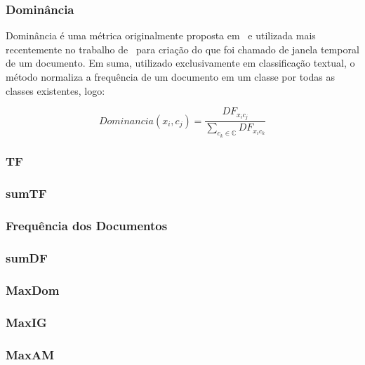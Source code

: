 \subsubsection{Dominância}
\label{subsubsection::dom}

Dominância é uma métrica originalmente proposta em~\cite{Zaiane02} e utilizada mais recentemente no trabalho de~\cite{Rocha08} para criação do que foi chamado de janela temporal de um documento. Em suma, utilizado exclusivamente em classificação textual, o método normaliza a frequência de um documento em um classe por todas as classes existentes, logo:

\begin{equation}\label{eqn::dom}
   Dominancia(x_i, c_j) = \frac{ DF_{x_ic_j} } { \sum\limits_{c_k \in \mathbb{C}} DF_{ x_ic_k } } 
\end{equation}

\subsubsection{TF}
\label{subsubsection::tf}

\subsubsection{sumTF}
\label{subsubsection::sumtf}

\subsubsection{Frequência dos Documentos}
\label{subsubsection::df}


\subsubsection{sumDF}
\label{subsubsection::sumdf}

\subsubsection{MaxDom}
\label{subsubsection::maxdom}

\subsubsection{MaxIG}
\label{subsubsection::maxig}

\subsubsection{MaxAM}
\label{subsubsection::maxam}

